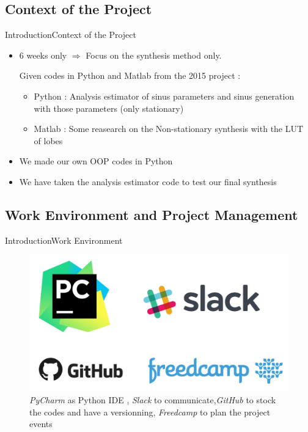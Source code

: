 \documentclass[10pt]{beamer}
\begin{document}
\subsection{Context of the Project}
\begin{frame}{Introduction}{Context of the Project}

  \begin{itemize}
    \item<1-> 6 weeks only $\Rightarrow$ Focus on the synthesis method only.
   \begin{block}{}
	 Given codes in Python and Matlab from the 2015 project :
   \begin{itemize}
 	\item<1-> Python : Analysis estimator of sinus parameters and sinus generation with those parameters (only stationary)
 	\item<1-> Matlab : Some reasearch on the Non-stationary synthesis with the LUT of lobes
   \end{itemize}
   \end{block}   
	\item<1-> We made our own OOP codes in Python
	\item<1-> We have taken the analysis estimator code to test our final synthesis
  \end{itemize}
\end{frame}

\subsection{Work Environment and Project Management}
\begin{frame}{Introduction}{Work Environment}

\begin{figure}
	\centering
	\includegraphics[scale=0.4]{all_softwares.png}
	\caption{ {\it PyCharm} as Python IDE , {\it Slack} to communicate,{\it GitHub} to stock the codes and have a versionning, {\it Freedcamp} to plan the project events }
\end{figure}
\end{frame}
\end{document}
